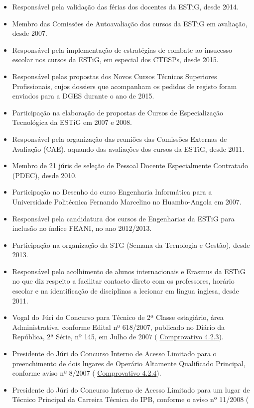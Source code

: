 \documentclass[11pt]{article}
\begin{document}
\begin{itemize}
\item{Responsável pela validação das férias dos docentes da ESTiG, desde 2014. }
\item{Membro das Comissões de Autoavaliação dos cursos da ESTiG em avaliação, desde 2007. }
\item{Responsável pela implementação de estratégias de combate ao insucesso escolar nos cursos da ESTiG, em especial dos CTESPs, desde 2015. }
\item{Responsável pelas propostas dos Novos Cursos Técnicos Superiores Profissionais, cujos dossiers que acompanham os pedidos de registo foram enviados para a DGES durante o ano de 2015. }
\item{Participação na elaboração de propostas de Cursos de Especialização Tecnológica da ESTiG em 2007 e 2008.}
\item{Responsável pela organização das reuniões das Comissões Externas de Avaliação (CAE), aquando das avaliações dos cursos da ESTiG, desde 2011. }
\item{Membro de 21 júris de seleção de Pessoal Docente Especialmente Contratado (PDEC), desde 2010. }
\item{Participação no Desenho do curso Engenharia Informática para a Universidade Politécnica Fernando Marcelino no Huambo-Angola em 2007.}
\item{Responsável pela candidatura dos cursos de Engenharias da ESTiG para inclusão no índice FEANI, no ano 2012/2013. }
\item{Participação na organização da STG (Semana da Tecnologia e Gestão), desde 2013. }
\item{Responsável pelo acolhimento de alunos internacionais e Erasmus da ESTiG no que diz respeito a facilitar contacto direto com os professores, horário escolar e na identificação de disciplinas a lecionar em língua inglesa, desde 2011.}
\item{Vogal do Júri do Concurso para Técnico de 2ª Classe estagiário, área Administrativa, conforme Edital nº 618/2007, publicado no Diário da República, 2ª Série, nº 145, em Julho de 2007 (
\href{run:MissaoIPBoutros/Tecnico2Classe.pdf}{Comprovativo 4.2.3}).}
\item{Presidente do Júri do Concurso Interno de Acesso Limitado para o preenchimento de dois lugares de Operário Altamente Qualificado Principal, conforme aviso nº 8/2007 (
\href{run:MissaoIPBoutros/Operario.pdf}{Comprovativo 4.2.4}).}
\item{Presidente do Júri do Concurso Interno de Acesso Limitado para um lugar de Técnico Principal da Carreira Técnica do IPB, conforme o aviso nº 11/2008 (
}
\end{itemize}
\end{document}
